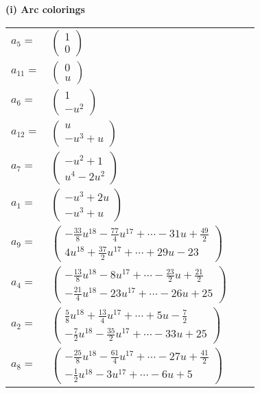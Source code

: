 \documentclass[1p]{elsarticle_modified}
\theoremstyle{definition}
\begin{document}
\flushleft \textbf{(i) Arc colorings}\\
\begin{tabular}{m{7pt} m{180pt} m{7pt} m{180pt} }
\flushright $a_{5}=$&$\begin{pmatrix}1\\0\end{pmatrix}$ \\
\flushright $a_{11}=$&$\begin{pmatrix}0\\u\end{pmatrix}$ \\
\flushright $a_{6}=$&$\begin{pmatrix}1\\- u^2\end{pmatrix}$ \\
\flushright $a_{12}=$&$\begin{pmatrix}u\\- u^3+u\end{pmatrix}$ \\
\flushright $a_{7}=$&$\begin{pmatrix}- u^2+1\\u^4-2 u^2\end{pmatrix}$ \\
\flushright $a_{1}=$&$\begin{pmatrix}- u^3+2 u\\- u^3+u\end{pmatrix}$ \\
\flushright $a_{9}=$&$\begin{pmatrix}-\frac{33}{8} u^{18}-\frac{77}{4} u^{17}+\cdots-31 u+\frac{49}{2}\\4 u^{18}+\frac{37}{2} u^{17}+\cdots+29 u-23\end{pmatrix}$ \\
\flushright $a_{4}=$&$\begin{pmatrix}-\frac{13}{8} u^{18}-8 u^{17}+\cdots-\frac{23}{2} u+\frac{21}{2}\\-\frac{21}{4} u^{18}-23 u^{17}+\cdots-26 u+25\end{pmatrix}$ \\
\flushright $a_{2}=$&$\begin{pmatrix}\frac{5}{8} u^{18}+\frac{13}{4} u^{17}+\cdots+5 u-\frac{7}{2}\\-\frac{7}{2} u^{18}-\frac{35}{2} u^{17}+\cdots-33 u+25\end{pmatrix}$ \\
\flushright $a_{8}=$&$\begin{pmatrix}-\frac{25}{8} u^{18}-\frac{61}{4} u^{17}+\cdots-27 u+\frac{41}{2}\\-\frac{1}{2} u^{18}-3 u^{17}+\cdots-6 u+5\end{pmatrix}$ \\

\end{tabular}
\end{document}
